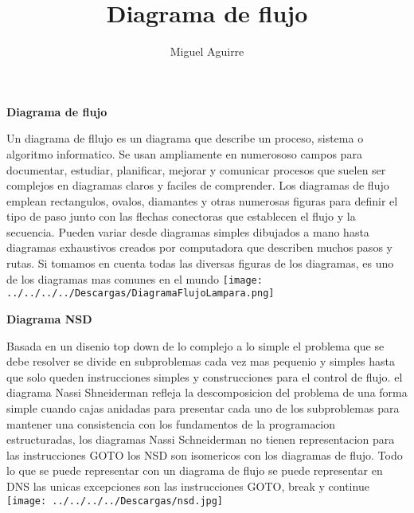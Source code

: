 \documentclass[11pt,a4paper]{article}
\title{Diagrama de flujo}
\author{Miguel Aguirre}
\begin{document}
\maketitle
\begin{multicols}{2}
\begin{center}
\textbf{Diagrama de flujo}
\end{center}
Un diagrama de fllujo es un diagrama que describe un proceso, sistema o algoritmo informatico. Se usan ampliamente en numerososo campos para documentar, estudiar, planificar, mejorar y comunicar procesos que suelen ser complejos en diagramas claros y faciles de comprender. Los diagramas de flujo emplean rectangulos, ovalos, diamantes y otras numerosas figuras para definir el tipo de paso junto con las flechas conectoras que establecen el flujo y la secuencia. Pueden variar desde diagramas simples dibujados a mano hasta diagramas exhaustivos creados por computadora que describen muchos pasos y rutas.
Si tomamos en cuenta todas las diversas figuras de los diagramas, es uno de los diagramas mas comunes en el mundo 	
\texttt{[image: ../../../../Descargas/DiagramaFlujoLampara.png]} 
\begin{center}
\textbf{Diagrama NSD}
\end{center}
Basada en un disenio top down de lo complejo a lo simple el problema que se debe resolver se divide en subproblemas cada vez mas pequenio y simples hasta que solo queden instrucciones simples y construcciones para el control de flujo. el diagrama Nassi Shneiderman refleja la descomposicion del problema de una forma simple cuando cajas anidadas para presentar cada uno de los subproblemas para mantener una consistencia con los fundamentos de la programacion estructuradas, los diagramas Nassi Schneiderman no tienen representacion para las instrucciones GOTO 
los NSD son isomericos con los diagramas de flujo. Todo lo que se puede representar con un diagrama de flujo se puede representar en DNS las unicas excepciones son las instrucciones GOTO, break y continue 
\texttt{[image: ../../../../Descargas/nsd.jpg]} 




\end{multicols}
\end{document}
